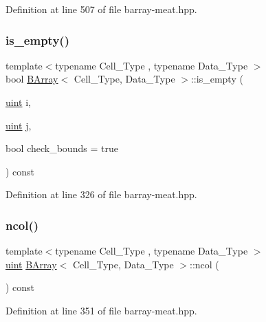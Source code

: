 Definition at line 507 of file barray-\/meat.\+hpp.

\mbox{\label{class_b_array_a37ed3962c0ee5030b23cb6cde23a5cdf}} 
\subsubsection{\texorpdfstring{is\+\_\+empty()}{is\_empty()}}
{\footnotesize\ttfamily template$<$typename Cell\+\_\+\+Type , typename Data\+\_\+\+Type $>$ \\
bool \hyperlink{class_b_array}{B\+Array}$<$ Cell\+\_\+\+Type, Data\+\_\+\+Type $>$\+::is\+\_\+empty (\begin{DoxyParamCaption}\item[{\hyperlink{typedefs_8hpp_a91ad9478d81a7aaf2593e8d9c3d06a14}{uint}}]{i,  }\item[{\hyperlink{typedefs_8hpp_a91ad9478d81a7aaf2593e8d9c3d06a14}{uint}}]{j,  }\item[{bool}]{check\+\_\+bounds = {\ttfamily true} }\end{DoxyParamCaption}) const\hspace{0.3cm}{\ttfamily [inline]}}



Definition at line 326 of file barray-\/meat.\+hpp.

\mbox{\label{class_b_array_ac669bd57e3cbf4c60bf2b4a459dcdc4f}} 
\subsubsection{\texorpdfstring{ncol()}{ncol()}}
{\footnotesize\ttfamily template$<$typename Cell\+\_\+\+Type , typename Data\+\_\+\+Type $>$ \\
\hyperlink{typedefs_8hpp_a91ad9478d81a7aaf2593e8d9c3d06a14}{uint} \hyperlink{class_b_array}{B\+Array}$<$ Cell\+\_\+\+Type, Data\+\_\+\+Type $>$\+::ncol (\begin{DoxyParamCaption}{ }\end{DoxyParamCaption}) const\hspace{0.3cm}{\ttfamily [inline]}}



Definition at line 351 of file barray-\/meat.\+hpp.

